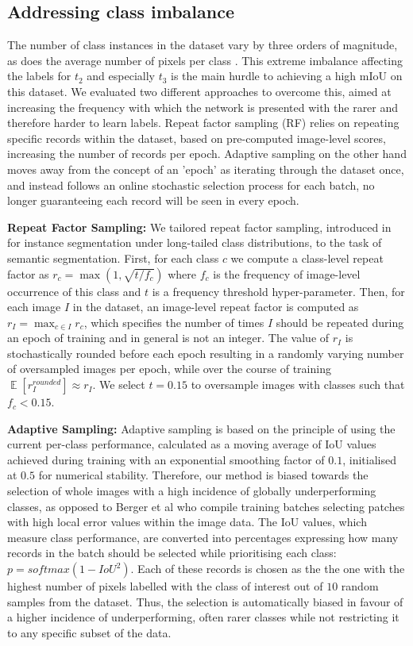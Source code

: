 \documentclass[runningheads]{llncs}
\newcommand{\tbf}[1]{\textbf{#1}}
\DeclareMathOperator{\EX}{\mathbb{E}}
\newcommand{\ta}[1]{\textbf{$t_{#1}$}}
\begin{document}
\subsection{Addressing class imbalance}\label{methods:imbalance}
The number of class instances in the dataset vary by three orders of magnitude, as does the average number of pixels per class \cite{CaDIS}. This extreme imbalance affecting the labels for \ta2 and especially \ta3 is the main hurdle to achieving a high mIoU on this dataset. We evaluated two different approaches to overcome this, aimed at increasing the frequency with which the network is presented with the rarer and therefore harder to learn labels. Repeat factor sampling (RF) relies on repeating specific records within the dataset, based on pre-computed image-level scores, increasing the number of records per epoch. Adaptive sampling on the other hand moves away from the concept of an 'epoch' as iterating through the dataset once, and instead follows an online stochastic selection process for each batch, no longer guaranteeing each record will be seen in every epoch.

\noindent\tbf{Repeat Factor Sampling:}
We tailored repeat factor sampling, introduced in \cite{gupta2019lvis} for instance segmentation under long-tailed class distributions, to the task of semantic segmentation. First, for each class $c$ we compute a class-level repeat factor as $r_c = \max(1,\sqrt{t/f_c})$ where $f_c$ is the frequency of image-level occurrence of this class and $t$ is a frequency threshold hyper-parameter. Then, for each image $I$ in the dataset, an image-level repeat factor is computed as $r_I=\max_{c \in I} r_c$, which specifies the number of times $I$ should be repeated during an epoch of training and in general is not an integer. The value of $r_I$ is stochastically rounded before each epoch resulting in a randomly varying number of oversampled images per epoch, while over the course of training $\EX[r^{rounded}_I] \approx r_I $. We select $t=0.15$ to oversample images with classes such that $f_c<0.15$.

\noindent\tbf{Adaptive Sampling:}
Adaptive sampling is based on the principle of using the current per-class performance, calculated as a moving average of IoU values achieved during training with an exponential smoothing factor of $0.1$, initialised at $0.5$ for numerical stability. Therefore, our method is biased towards the selection of whole images with a high incidence of globally underperforming classes, as opposed to Berger et al \cite{berger2018adaptive} who compile training batches selecting patches with high local error values within the image data. The IoU values, which measure class performance, are converted into percentages expressing how many records in the batch should be selected while prioritising each class: $p = softmax(1 - {IoU}^2)$. Each of these records is chosen as the the one with the highest number of pixels labelled with the class of interest out of $10$ random samples from the dataset. Thus, the selection is automatically biased in favour of a higher incidence of underperforming, often rarer classes while not restricting it to any specific subset of the data.
\end{document}
